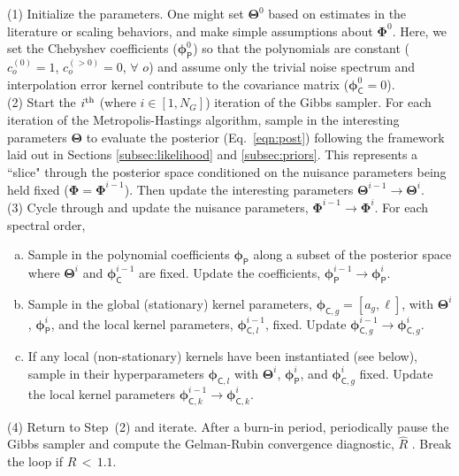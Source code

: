 \documentclass[iop,floatfix,twocolappendix]{emulateapj}
\newcommand{\vT}{ {\bm \Theta}}
\newcommand{\vp}{ {\bm \phi}}
\newcommand{\vP}{ {\bm \Phi}}
\newcommand{\cheb}{ \vp_{\mathsf{P}}}
\newcommand{\cov}{ \vp_{\mathsf{C}}}
\begin{document}
\noindent (1) Initialize the parameters.  One might set $\vT^0$ based on estimates in the 
literature or scaling behaviors, and make simple assumptions about $\vP^0$.  Here, we set the 
Chebyshev coefficients ($\cheb^0$) so that the polynomials are constant ($c_o^{(0)} = 1$,  
$c_o^{(>0)} = 0$, $\forall$ $o$) and assume only the trivial noise spectrum and interpolation error 
kernel contribute to the covariance matrix ($\cov^0 = 0$).  \\

\noindent (2) Start the $i^{\rm th}$ (where $i \in [1,N_G]$) iteration of the Gibbs sampler.  For 
each iteration of the Metropolis-Hastings algorithm, sample in the interesting parameters $\vT$ to 
evaluate the posterior (Eq.~\ref{eqn:post}) following the framework laid out in Sections 
\ref{subsec:likelihood} and \ref{subsec:priors}.  This represents a ``slice" through the posterior 
space conditioned on the nuisance parameters being held fixed ($\vP = \vP^{i-1}$).  Then update the 
interesting parameters $\vT^{i-1} \rightarrow \vT^i$. \\

\noindent (3) Cycle through and update the nuisance parameters, $\vP^{i-1} \rightarrow \vP^i$.  For 
each spectral order,   

\begin{enumerate}[(a)]
\item Sample in the polynomial coefficients $\cheb$ along a subset of the posterior space where 
$\vT^i$ and $\cov^{i-1}$ are fixed.  Update the coefficients, $\cheb^{i-1} \rightarrow \cheb^i$.  

\item Sample in the global (stationary) kernel parameters, $\vp_{{\mathsf C},g} = [a_g, \ell]$, 
with $\vT^i$, $\cheb^i$, and the local kernel parameters, $\vp_{{\mathsf C}, l}^{i-1}$, fixed.  
Update $\vp_{{\mathsf C}, g}^{i-1} \rightarrow \vp_{{\mathsf C}, g}^i$.

\item If any local (non-stationary) kernels have been instantiated (see below), sample in their 
hyperparameters $\vp_{{\mathsf C},l}$ with $\vT^i$, $\cheb^i$, and $\vp_{{\mathsf C}, g}^i$ fixed.  
Update the local kernel parameters $\vp_{{\mathsf C}, k}^{i-1} \rightarrow \vp_{{\mathsf C}, k}^i$. 

\end{enumerate}

\noindent (4) Return to Step~(2) and iterate.  After a burn-in period, periodically pause the Gibbs 
sampler and compute the Gelman-Rubin convergence diagnostic, $\hat{R}$ \citep[][their 
Eq.~11.4]{gelman13}.  Break the loop if $\hat{R} \, < \, 1.1$.  \\
\end{document}

